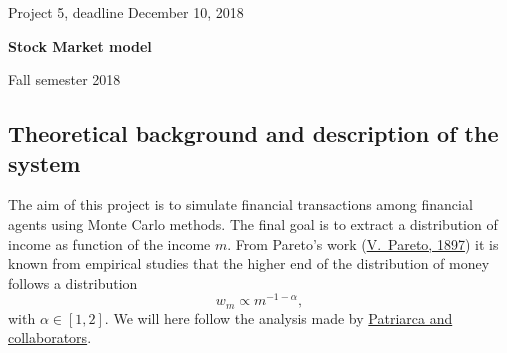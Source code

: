 \documentclass[%
oneside,                 %
final,                   %
10pt]{article}
\begin{document}

\newcommand{\exercisesection}[1]{\subsection*{#1}}






\thispagestyle{empty}

\begin{center}
{\LARGE\bf
\begin{spacing}{1.25}
Project 5, deadline  December 10, 2018
\end{spacing}
}
\end{center}


\begin{center}
{\bf Stock Market model${}^{}$} \\ [0mm]
\end{center}

\begin{center}
\end{center}
    

\begin{center}
Fall semester 2018
\end{center}

\vspace{1cm}


\subsection*{Theoretical background and description of the system}

The aim of this project is to simulate financial transactions among financial agents
using Monte Carlo methods. The final goal is to extract a distribution of income  as function
of the income $m$.   From Pareto's work (\href{{http://www.institutcoppet.org/2012/05/08/cours-deconomie-politique-1896-de-vilfredo-pareto}}{V.~Pareto, 1897}) it is known from empirical studies
that the higher end of the distribution of money follows a distribution 
\[
w_m\propto m^{-1-\alpha},
\]
with $\alpha\in [1,2]$. We will here follow the analysis made by \href{{http://www.sciencedirect.com/science/article/pii/S0378437104004327}}{Patriarca and collaborators}. 
\end{document}

